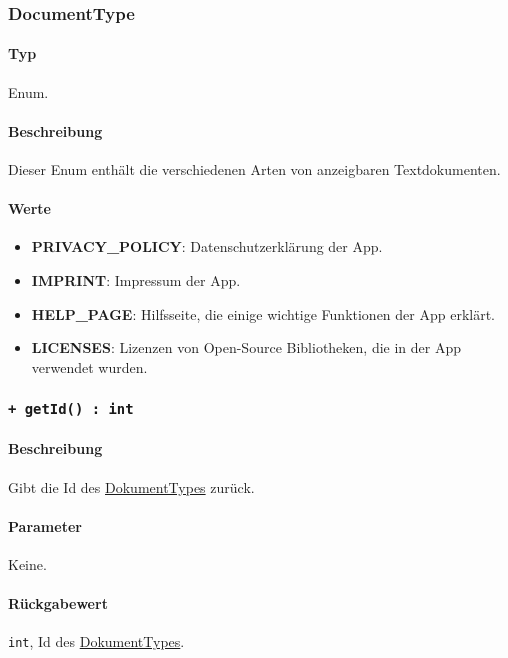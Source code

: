 \subsubsection{DocumentType}\label{App_DocumentViewer_DocumentType}
\paragraph*{Typ}
Enum.
\paragraph*{Beschreibung}
Dieser Enum enthält die verschiedenen Arten von anzeigbaren Textdokumenten.

\paragraph*{Werte}
\begin{itemize}
    \item \textbf{PRIVACY\_POLICY}: Datenschutzerklärung der App.
    \item \textbf{IMPRINT}: Impressum der App.
    \item \textbf{HELP\_PAGE}: Hilfsseite, die einige wichtige Funktionen der App erklärt.
    \item \textbf{LICENSES}: Lizenzen von Open-Source Bibliotheken, die in der App verwendet wurden.
\end{itemize}

\subsubsection*{\texttt{+ getId() : int}}\label{App_DocumentViewer_DocumentType_getId}%
\paragraph*{Beschreibung}
Gibt die Id des \hyperref[App_DocumentViewer_DocumentType]{DokumentTypes} zurück.
\paragraph*{Parameter}
Keine.
\paragraph*{Rückgabewert}
\texttt{int}, Id des \hyperref[App_DocumentViewer_DocumentType]{DokumentTypes}.